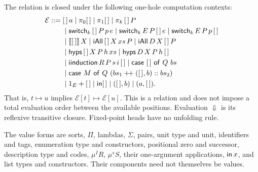 The relation is closed under the following one-hole computation contexts:
\begin{align*}
\mathcal E::={}&[\,]\,a\mid\pi_0[\,]\mid\pi_1[\,]\mid\pi_k\,[\,]\,P\\
 &\mid\mathsf{switch}_k\,[\,]\,P\,p\,e
 \mid\mathsf{switch}_k\,E\,P\,[\,]\,e
 \mid\mathsf{switch}_k\,E\,P\,p\,[\,]\\
 &\mid\llbracket [\,]\rrbracket\,X
 \mid\mathsf{iAll}\,[\,]\,X\,xs\,P
 \mid\mathsf{iAll}\,D\,X\,[\,]\,P\\
 &\mid\mathsf{hyps}\,[\,]\,X\,P\,h\,xs
 \mid\mathsf{hyps}\,D\,X\,P\,h\,[\,]\\
 &\mid\mathsf{iinduction}\,R\,P\,s\,i\,[\,]
 \mid\mathsf{case}\ [\,]\ \mathsf{of}\ Q\ bs\\
 &\mid\mathsf{case}\ M\ \mathsf{of}\ Q\ (bs_1\mathbin{+\!+}([\,],b)::bs_2)\\
 &\mid 1_E+[\,]\mid\mathsf{in}[\,]\mid([\,],b)\mid(a,[\,]).
\end{align*}
That is, $t\longmapsto u$ implies $\mathcal E[t]\longmapsto\mathcal E[u]$. This is a relation and does not impose a total evaluation order between the available positions. Evaluation $\Downarrow$ is its reflexive transitive closure. Fixed-point heads have no unfolding rule.

The value forms are sorts, $\Pi$, lambdas, $\Sigma$, pairs, unit type and unit, identifiers and tags, enumeration type and constructors, positional zero and successor, description type and codes, $\mu^I R$, $\mu^s S$, their one-argument applications, $\mathsf{in}\,x$, and list types and constructors. Their components need not themselves be values.
